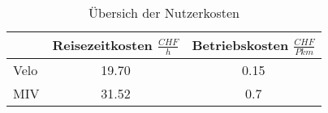 %
%
%
%

\begin{table}[h!]
\flushleft
\renewcommand{\arraystretch}{1.4}

\begin{tabular}{ @{} l|c|c @{} }
            & Reisezeitkosten   $\frac{CHF}{h}$	& Betriebskosten   $\frac{CHF}{Pkm}$         \\ \hline
Velo	    &       19.70          			    &      0.15       			                \\
MIV         &      	31.52          		        &      0.7                    
\end{tabular}
\caption{Übersich der Nutzerkosten}
\label{tab:t-04-03-02-Nutzerkosten}
\end{table}

%
%





%


